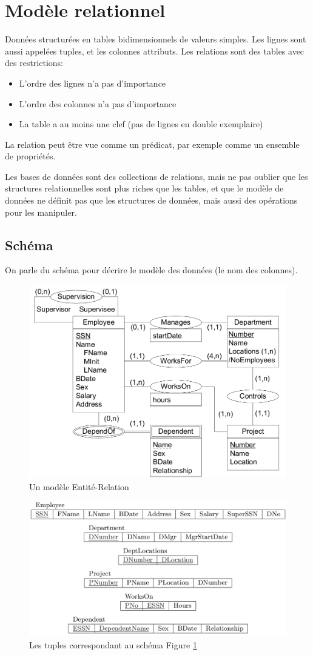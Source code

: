\documentclass[a4paper]{article}
\begin{document}

\section{Modèle relationnel}
Données structurées en tables bidimensionnels de valeurs simples. Les lignes
sont aussi appelées tuples, et les colonnes attributs.
Les relations sont des tables avec des restrictions:
\begin{itemize}
  \item L'ordre des lignes n'a pas d'importance
  \item L'ordre des colonnes n'a pas d'importance
  \item La table a au moins une clef (pas de lignes en double exemplaire)
\end{itemize}
La relation peut être vue comme un prédicat, par exemple comme un ensemble de propriétés.

Les bases de données sont des collections de relations, mais ne pas oublier que
les structures relationnelles sont plus riches que les tables, et que le modèle de 
données ne définit pas que les structures de données, mais aussi des opérations
pour les manipuler.

\subsection{Schéma}
On parle du schéma pour décrire le modèle des données (le nom des colonnes).

\begin{figure}[h!]
    \center
    \includegraphics[width=.5\textwidth]{fig/relmodel-er.png}
    \caption{\label{fig:relmodel-er}Un modèle Entité-Relation}
\end{figure}
\begin{figure}[h!]
    \center
    \includegraphics[width=.7\textwidth]{fig/relmodel-tuples.png}
    \caption{Les tuples correspondant au schéma Figure \ref{fig:relmodel-er}}
\end{figure}
\end{document}
